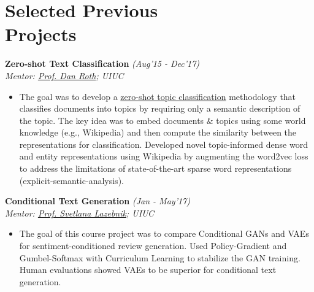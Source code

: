 \section{\mysidestyle Selected Previous\\Projects}
\vspace{0mm}
\textsf{\textbf{Zero-shot Text Classification}} \hfill\textit{\small(Aug'15 - Dec'17)}
\\ {\textit{Mentor: \href{http://www.cis.upenn.edu/~danroth/}{Prof. Dan Roth}; UIUC}} \hfill{}
\normalsize
\begin{itemize}[leftmargin=*]\compresslist
\item[] The goal was to develop a \href{https://www.aaai.org/Papers/AAAI/2008/AAAI08-132.pdf}{zero-shot topic classification} methodology that classifies documents into topics by requiring only a semantic description of the topic. The key idea was to embed documents \& topics using some world knowledge (e.g., Wikipedia) and then compute the similarity between the representations for classification. Developed novel topic-informed dense word and entity representations using Wikipedia by augmenting the word2vec loss to address the limitations of state-of-the-art sparse word representations (explicit-semantic-analysis).
\end{itemize}

\textsf{\textbf{Conditional Text Generation}} \hfill\textit{\small(Jan - May'17)}
\\ {\textit{Mentor: \href{http://slazebni.cs.illinois.edu/}{Prof. Svetlana Lazebnik}; UIUC}}
\begin{itemize}[leftmargin=*]\compresslist
\item[] The goal of this course project was to compare Conditional GANs and VAEs for sentiment-conditioned review generation. Used Policy-Gradient and Gumbel-Softmax with Curriculum Learning to stabilize the GAN training. Human evaluations showed VAEs to be superior for conditional text generation.
\end{itemize}

